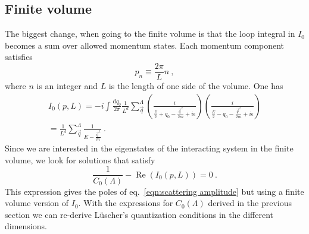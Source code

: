 \documentclass[11pt]{article}
\begin{document}
\subsection{Finite volume}
The biggest change, when going to the finite volume is that the loop integral in $I_0$ becomes a sum over allowed momentum states.  Each momentum component satisfies
\begin{equation}
p_n\equiv \frac{2\pi}{L}n\ ,
\end{equation}
where $n$ is an integer and $L$ is the length of one side of the volume.  One has
\begin{multline}
I_0(p,L)=-i\int \frac { \mathrm {d}q_0}{2\pi} \frac{1}{L^d}\sum_{\vec{q}}^\Lambda \left( \frac { i } { \frac{E}{2} + q _ { 0 } - \frac{\vec{q}^2}{2m} + i \epsilon } \right) \left( \frac { i } { \frac{E}{2} - q _ { 0 } - \frac{\vec{q}^2}{2m} + i \epsilon } \right)\\
=\frac{1}{L^d}\sum_{\vec{q}}^\Lambda \frac { 1 } { E - \frac{\vec{q}^2}{m} } \ .
\end{multline}
Since we are interested in the eigenstates of the interacting system in the finite volume, we look for solutions that satisfy
\begin{equation}\label{eqn:quantization}
\frac { 1 } { C _ { 0 } (\Lambda ) } - \operatorname { Re } \left( I_0(p,L) \right) = 0\ .
\end{equation}
This expression gives the poles of eq.~\eqref{eqn:scattering amplitude} but using a finite volume version of $I_0$.  With the expressions for $C_0(\Lambda)$ derived in the previous section we can re-derive L\"uscher's quantization conditions in the different dimensions.
\end{document}
